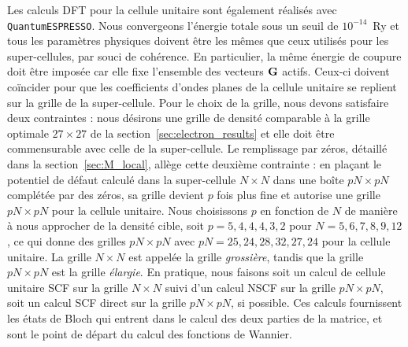 Les calculs DFT pour la cellule unitaire sont également réalisés avec \texttt{QuantumESPRESSO}. Nous convergeons l'énergie totale sous un seuil de $10^{-14}$~Ry et tous les paramètres physiques doivent être les mêmes que ceux utilisés pour les super-cellules, par souci de cohérence. En particulier, la même énergie de coupure doit être imposée car elle fixe l'ensemble des vecteurs $\mathbf{G}$ actifs. Ceux-ci doivent coïncider pour que les coefficients d'ondes planes de la cellule unitaire se replient sur la grille de la super-cellule. Pour le choix de la grille, nous devons satisfaire deux contraintes : nous désirons une grille de densité comparable à la grille optimale $27\times27$ de la section~\ref{sec:electron_results} et elle doit être commensurable avec celle de la super-cellule. Le remplissage par zéros, détaillé dans la section~\ref{sec:M_local}, allège cette deuxième contrainte : en plaçant le potentiel de défaut calculé dans la super-cellule
$N\times N$ dans une boîte $pN\times pN$ complétée par des zéros, sa grille devient $p$ fois plus fine et autorise une grille $pN\times pN$ pour la cellule unitaire. Nous choisissons $p$ en fonction de $N$ de manière à nous approcher de la densité cible, soit $p = 5, 4, 4, 4, 3, 2$ pour $N = 5, 6, 7, 8, 9, 12$, ce qui donne des grilles $pN\times pN$ avec $pN = 25, 24, 28, 32, 27, 24$ pour la cellule unitaire. La grille $N\times N$ est appelée la grille \textit{grossière}, tandis que la grille $pN\times pN$ est la grille \textit{élargie}. En pratique, nous faisons soit un calcul de cellule unitaire SCF sur la grille $N\times N$ suivi d'un calcul NSCF sur la grille $pN\times pN$, soit un calcul SCF direct sur la grille $pN\times pN$, si possible. Ces calculs fournissent les états de Bloch qui entrent dans le calcul des deux parties de la matrice, et sont le point de départ du calcul des fonctions de Wannier.

\bigskip
{}

